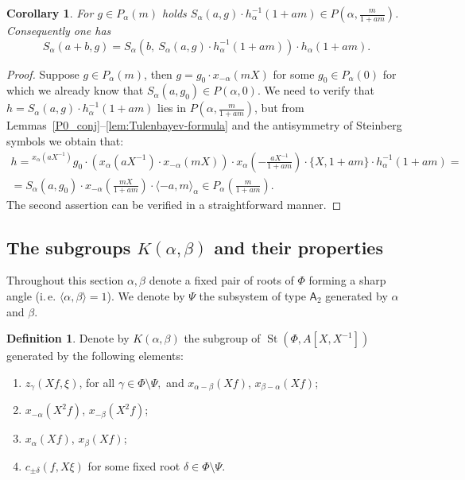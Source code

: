 \documentclass[oneside, 8pt]{amsart}
\newtheorem{corollary}{Corollary}
\newtheorem{lemma}{Lemma}
\theoremstyle{remark}
\theoremstyle{definition}
\newtheorem{df}[lemma]{Definition} \Crefname{df}{Definition}{Definitions}
\DeclareMathOperator{\St}{St}
\newcommand{\rA}{\mathsf{A}}
\numberwithin{equation}{section}
\begin{document}
\begin{corollary} For $g \in P_\alpha(m)$ holds $S_\alpha(a, g) \cdot h_\alpha^{-1}(1 + am) \in P(\alpha, \frac{m}{1 + am})$.
Consequently one has \[ S_\alpha(a+b, g) = S_\alpha\left(b,\ S_\alpha(a, g) \cdot h_\alpha^{-1}(1 + am)\right)\cdot h_\alpha(1+am). \]\end{corollary}
\begin{proof}
Suppose $g \in P_\alpha(m)$, then $g = g_0 \cdot x_{-\alpha}(mX)$ for some $g_0 \in P_\alpha(0)$ for which we already know that $S_\alpha(a, g_0) \in P(\alpha, 0)$.
We need to verify that $h = S_\alpha(a, g) \cdot h_\alpha^{-1}(1 + am)$ lies in $P\left(\alpha, \frac{m}{1 + am}\right)$, but from Lemmas~\ref{P0_conj}--\ref{lem:Tulenbayev-formula} and the antisymmetry of Steinberg symbols we obtain that:
\begin{multline} \nonumber h = {}^{x_\alpha(aX^{-1})}\!g_0 \cdot \left(x_{\alpha}(aX^{-1}) \cdot x_{-\alpha}(mX)\right) \cdot x_{\alpha}\left(-\frac{aX^{-1}}{1+am}\right) \cdot \{X, 1+am\} \cdot h_\alpha^{-1}(1 + am) = \\
= S_\alpha(a, g_0) \cdot x_{-\alpha}\left(\frac{mX}{1+am}\right) \cdot \langle -a, m\rangle_\alpha \in P_\alpha\left(\frac{m}{1+am}\right). \end{multline}
The second assertion can be verified in a straightforward manner. \end{proof}

\begin{comment}
\begin{lemma} If $\alpha - \beta \in \Phi$ then for all $g \in \St(\Phi, R[X], XM[X])$ holds $S_\alpha(a, g) \in P_\beta(0)$. \end{lemma}
\begin{proof}
It suffices to verify the assertion for the generators $z_\gamma(Xf, g)$, $\gamma \in \Phi$.
By our assumption $(\alpha, \beta) \geq 0$. 
\end{proof}
\end{comment}

\subsection{The subgroups $K(\alpha, \beta)$ and their properties}
Throughout this section $\alpha, \beta$ denote a fixed pair of roots of $\Phi$ forming a sharp angle (i.\,e. $\langle \alpha, \beta \rangle = 1$). We denote by $\Psi$ the subsystem of type $\rA_2$ generated by $\alpha$ and $\beta$.
\begin{df}
 Denote by $K(\alpha, \beta)$ the subgroup of $\St(\Phi, A[X, X^{-1}])$ generated by the following elements:
 \begin{enumerate}
  \item $z_\gamma(Xf, \xi)$, for all $\gamma \in \Phi \setminus \Psi,$ and $x_{\alpha-\beta}(Xf)$, $x_{\beta-\alpha}(Xf)$;
  \item $x_{-\alpha}(X^2f)$, $x_{-\beta}(X^2f)$;
  \item $x_{\alpha}(Xf)$, $x_\beta(Xf)$;
  \item $c_{\pm \delta}(f, X\xi)$ for some fixed root $\delta \in \Phi \setminus \Psi$.
 \end{enumerate}
\end{df}
\end{document}
